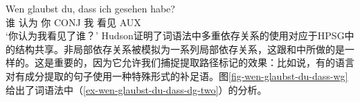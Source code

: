 \ea
\label{ex-wen-glaubst-du-dass-dg-two}
\gll Wen glaubst du, dass ich gesehen habe?\\
     谁 认为 你 CONJ 我 看见 AUX\\
\glt `你认为我看见了谁？'
\z
Hudson证明了词语法\indexwgc 中多重依存关系的使用对应于HPSG\indexhpsgc 中的结构共享\citep[]{Hudson97a}。非局部依存关系被模拟为一系列局部依存关系，这跟\gpsgc 和\hpsgc 中所做的是一样的。这是重要的，因为它允许我们捕捉提取路径标记的效果\citep*[--2, \S~3.2]{BMS2001a}：比如说，有的语言对有成分提取的句子使用一种特殊形式的补足语。图\vref{fig-wen-glaubst-du-dass-wg}给出了词语法中（\ref{ex-wen-glaubst-du-dass-dg-two}）的分析。

